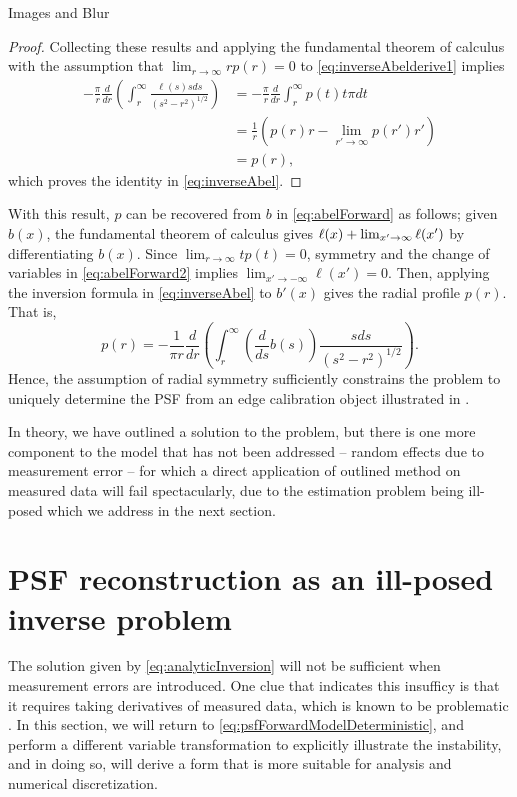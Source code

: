 \begin{chapter}{Images and Blur}
\begin{proof}
  Collecting these results and applying the fundamental theorem of calculus with the assumption that $\lim_{r\to\infty}rp(r) = 0$ to \eqref{eq:inverseAbelderive1} implies
  \begin{align}
    -\frac{\pi}{r} \frac{d}{dr} \left(\int_r^\infty \frac{\ell(s) s ds}{ (s^2 - r^2)^{1/2} } \right) 
      &= -\frac{\pi}{r} \frac{d}{dr} \int_r^\infty p(t) t \pi dt \nonumber\\
      &= \frac{1}{r} \left(p(r)r - \lim_{r'\to\infty}p(r')r'\right) \nonumber\\
      &= p(r),
  \end{align}
  which proves the identity in \eqref{eq:inverseAbel}.
\end{proof}
  
  With this result, $p$ can be recovered from $b$ in \eqref{eq:abelForward} as follows; given $b(x)$, the fundamental theorem of calculus gives $\ell(x) + \lim_{x'\to\-\infty}\ell(x')$ by differentiating $b(x)$.
  Since $\lim_{r\to\infty}tp(t) = 0$, symmetry and the change of variables in \eqref{eq:abelForward2} implies $\lim_{x'\to-\infty}\ell(x') = 0$. 
  Then, applying the inversion formula in \eqref{eq:inverseAbel} to $b'(x)$ gives the radial profile $p(r)$.
  That is,
  \begin{equation} \label{eq:analyticInversion}
    p(r) = -\frac{1}{\pi r} \frac{d}{dr}\left(\int_r^\infty \left(\frac{d}{ds} b(s)\right) \frac{ s ds}{ (s^2 - r^2)^{1/2} } \right).  
  \end{equation}
  Hence, the assumption of radial symmetry sufficiently constrains the problem to uniquely determine the PSF from an edge calibration object illustrated in .

  In theory, we have outlined a solution to the problem, but there is one more component to the model that has not been addressed -- random effects due to measurement error -- for which a direct application of outlined method on measured data will fail spectacularly, due to the estimation problem being ill-posed which we address in the next section.

\section{PSF reconstruction as an ill-posed inverse problem}
  
  The solution given by \eqref{eq:analyticInversion} will not be sufficient when measurement errors are introduced. 
  One clue that indicates this insufficy is that it requires taking derivatives of measured data, which is known to be problematic \citep{hanke2001}.
  In this section, we will return to \eqref{eq:psfForwardModelDeterministic}, and perform a different variable transformation to explicitly illustrate the instability, and in doing so, will derive a form that is more suitable for analysis and numerical discretization.


\end{chapter}
